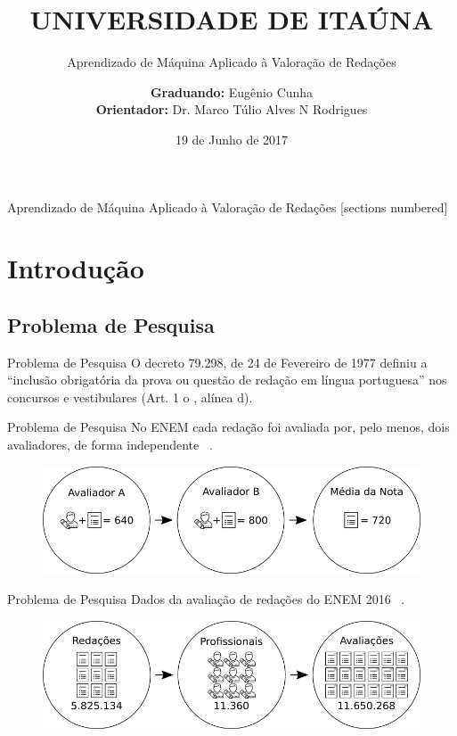 \documentclass[10pt]{beamer}
\title{UNIVERSIDADE DE ITAÚNA}
\subtitle{Aprendizado de Máquina Aplicado à Valoração de Redações}
\date{19 de Junho de 2017}
\author{\textbf{Graduando:} Eugênio Cunha \\ \textbf{Orientador:} Dr. Marco Túlio Alves N Rodrigues}
\institute{{Departamento de Ciência da Computação \small} \\ {Bacharelado em Ciência da Computação \small}}
\begin{document}
\maketitle

\begin{frame}{Aprendizado de Máquina Aplicado à Valoração de Redações}
  [sections numbered]
  \tableofcontents[subsectionstyle=show]
\end{frame}

\section{Introdução}

  \subsection{Problema de Pesquisa}
    \begin{frame}[fragile]{Problema de Pesquisa}
    O decreto 79.298, de 24 de Fevereiro de 1977 definiu a “inclusão obrigatória da prova ou questão de redação em língua portuguesa” nos concursos e vestibulares (Art. 1 o , alínea d).
    \end{frame}

    \begin{frame}[fragile]{Problema de Pesquisa}
    No ENEM cada redação foi avaliada por, pelo menos, dois avaliadores, de forma independente ~\cite{edital_enem:2016}.
    \begin{figure}[H]
    \begin{center}
        \includegraphics[scale=0.50]{images/correction_redaction_enem.png}
    \end{center}
    \end{figure}
    \end{frame}

    \begin{frame}[fragile]{Problema de Pesquisa}
    Dados da avaliação de redações do ENEM 2016 ~\cite{paq_a:2016}.
    \begin{figure}[H]
    \begin{center}
        \includegraphics[scale=0.50]{images/enem_2016.png}
    \end{center}
    \end{figure}
    \end{frame}
\end{document}
